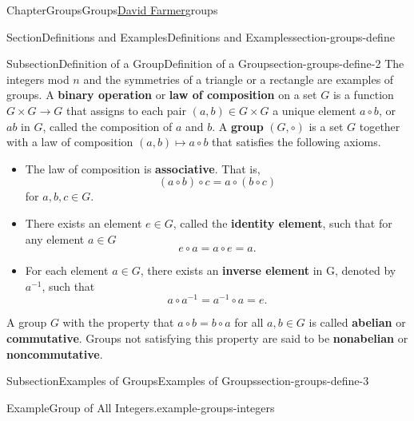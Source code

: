 \documentclass[oneside,10pt,]{book}
\newcommand{\terminology}[1]{\textbf{#1}}
\numberwithin{equation}{section}
\begin{document}
\begin{chapterptx}{Chapter}{Groups}{}{Groups}{\hyperlink{dfarmer}{David Farmer}}{}{groups}
\begin{sectionptx}{Section}{Definitions and Examples}{}{Definitions and Examples}{}{}{section-groups-define}
\begin{subsectionptx}{Subsection}{Definition of a Group}{}{Definition of a Group}{}{}{section-groups-define-2}
The integers mod \(n\) and the symmetries of a triangle or a rectangle are examples of groups.  A \terminology{binary operation} or \terminology{law of composition} on a set \(G\) is a function \(G \times G \rightarrow G\) that assigns to each pair \((a,b) \in G \times G\) a unique element \(a \circ b\), or \(ab\) in \(G\), called the composition of \(a\) and \(b\).  A \terminology{group} \((G, \circ )\) is a set \(G\) together with a law of composition \((a,b) \mapsto a \circ b\) that satisfies the following axioms.%
\begin{itemize}[label=\textbullet]
\item{}The law of composition is \terminology{associative}. That is,%
\begin{equation*}
(a \circ b) \circ c = a \circ (b \circ c)
\end{equation*}
for \(a, b, c \in G\).%
\item{}There exists an element \(e \in G\), called the \terminology{identity element}, such that for any element \(a \in G\)%
\begin{equation*}
e \circ a = a \circ e = a\text{.}
\end{equation*}
%
\item{}For each element \(a \in G\), there exists an \terminology{inverse element} in G, denoted by \(a^{-1}\), such that%
\begin{equation*}
a \circ a^{-1} = a^{-1} \circ a = e\text{.}
\end{equation*}
%
\end{itemize}
%
\par
A group \(G\) with the property that \(a \circ b = b \circ a\) for all \(a, b \in G\) is called \terminology{abelian} or \terminology{commutative}.  Groups not satisfying this property are said to be  \terminology{nonabelian} or \terminology{noncommutative}.%
\end{subsectionptx}
%
%
\typeout{************************************************}
\typeout{************************************************}
%
\begin{subsectionptx}{Subsection}{Examples of Groups}{}{Examples of Groups}{}{}{section-groups-define-3}
\begin{example}{Example}{Group of All Integers.}{example-groups-integers}%

\end{example}
\end{subsectionptx}
\end{sectionptx}
\end{chapterptx}
\end{document}
